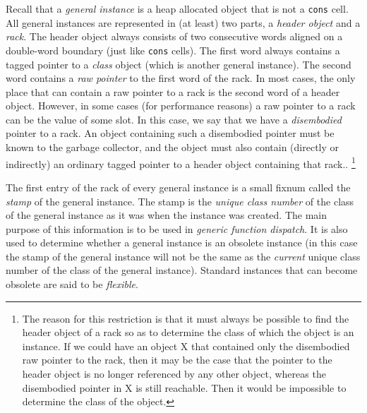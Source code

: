 Recall that a \emph{general instance} is a heap allocated object that
is not a \texttt{cons} cell.
All general instances are represented in (at
least) two parts, a \emph{header object} and a \emph{rack}.
The header object always consists of two consecutive words aligned on
a double-word boundary (just like \texttt{cons} cells).  The first
word always contains a tagged pointer to a \emph{class} object (which
is another general instance).  The second word contains a \emph{raw
  pointer} to the first word of the rack.  In most cases,
the only place that can contain a raw pointer to a rack is
the second word of a header object.  However, in some cases (for
performance reasons) a raw pointer to a rack can be the
value of some slot.  In this case, we say that we have a
\emph{disembodied} pointer to a rack.  An object containing
such a disembodied pointer must be known to the garbage collector, and
the object must also contain (directly or indirectly) an ordinary
tagged \commonlisp{} pointer to a header object containing that rack..%
\footnote{The reason for this restriction is that it must always be possible
  to find the header object of a rack so as to determine
  the class of which the object is an instance.  If we could have
  an object X that contained only the disembodied raw pointer to the
  rack, then it may be the case that the pointer to the
  header object is no longer referenced by any other object, whereas
  the disembodied pointer in X is still reachable.  Then it would be
  impossible to determine the class of the object.}

The first entry of the rack of every general instance is a
small fixnum called the \emph{stamp} of the general instance.  The
stamp is the \emph{unique class number} of the class of the general
instance as it was when the instance was created.  The main purpose of
this information is to be used in \emph{generic function dispatch}.
It is also used to determine whether a general instance is an obsolete
instance (in this case the stamp of the general instance will not be
the same as the \emph{current} unique class number of the class of the
general instance).  Standard instances that can become obsolete are
said to be \emph{flexible}.

